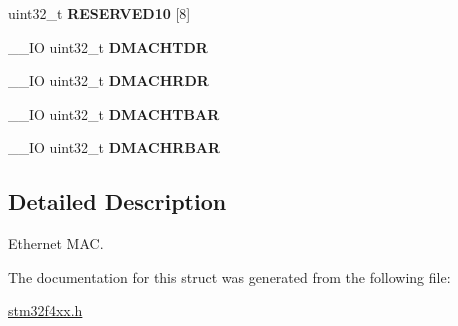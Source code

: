 \begin{DoxyCompactItemize}
\item 
\hypertarget{struct_e_t_h___type_def_a57d552323802fb4dd0bac95a02e814f0}{uint32\-\_\-t {\bfseries R\-E\-S\-E\-R\-V\-E\-D10} \mbox{[}8\mbox{]}}\label{struct_e_t_h___type_def_a57d552323802fb4dd0bac95a02e814f0}

\item 
\hypertarget{struct_e_t_h___type_def_ab5bb348210fdd9a5538eb57abc5a5673}{\-\_\-\-\_\-\-I\-O uint32\-\_\-t {\bfseries D\-M\-A\-C\-H\-T\-D\-R}}\label{struct_e_t_h___type_def_ab5bb348210fdd9a5538eb57abc5a5673}

\item 
\hypertarget{struct_e_t_h___type_def_a9c49de2e699886d6604fd2b3d376a0e9}{\-\_\-\-\_\-\-I\-O uint32\-\_\-t {\bfseries D\-M\-A\-C\-H\-R\-D\-R}}\label{struct_e_t_h___type_def_a9c49de2e699886d6604fd2b3d376a0e9}

\item 
\hypertarget{struct_e_t_h___type_def_a900f9f888342fbdd8ee07e3ee1d4b73c}{\-\_\-\-\_\-\-I\-O uint32\-\_\-t {\bfseries D\-M\-A\-C\-H\-T\-B\-A\-R}}\label{struct_e_t_h___type_def_a900f9f888342fbdd8ee07e3ee1d4b73c}

\item 
\hypertarget{struct_e_t_h___type_def_acf3f7ecbf774d8d505655ac7f24761fc}{\-\_\-\-\_\-\-I\-O uint32\-\_\-t {\bfseries D\-M\-A\-C\-H\-R\-B\-A\-R}}\label{struct_e_t_h___type_def_acf3f7ecbf774d8d505655ac7f24761fc}

\end{DoxyCompactItemize}


\subsection{Detailed Description}
Ethernet M\-A\-C. 

The documentation for this struct was generated from the following file\-:\begin{DoxyCompactItemize}
\item 
\hyperlink{stm32f4xx_8h}{stm32f4xx.\-h}\end{DoxyCompactItemize}
